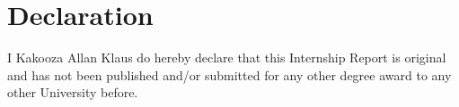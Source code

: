\cleardoublepage
{}
\chapter*{Declaration}
I Kakooza Allan Klaus do hereby declare that this Internship Report is original and has not been published and/or submitted for any other degree award to any other University before.


\vspace{1.0in}

\newpage

